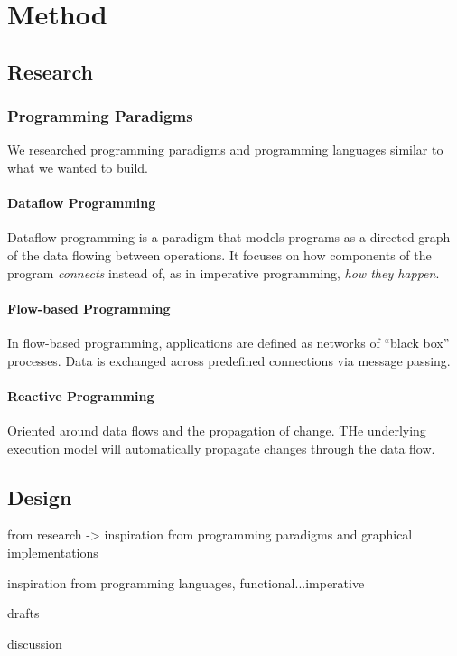 \chapter{Method}

\section{Research}

\subsection{Programming Paradigms}
We researched programming paradigms and programming languages similar
to what we wanted to build.

\subsubsection{Dataflow Programming}
Dataflow programming is a paradigm that models programs as a directed
graph of the data flowing between operations. It focuses on how
components of the program \emph{connects} instead of, as in imperative
programming, \emph{how they happen}. 

\subsubsection{Flow-based Programming}
In flow-based programming, applications are defined as networks of
``black box'' processes. Data is exchanged across predefined
connections via message passing. 

\subsubsection{Reactive Programming}
Oriented around data flows and the propagation of change. THe
underlying execution model will automatically propagate changes
through the data flow. 


\section{Design}
from research -> inspiration from programming paradigms and graphical
implementations

inspiration from programming languages, functional...imperative

drafts

discussion


